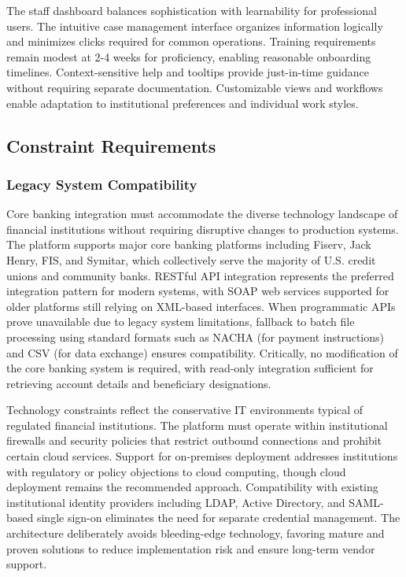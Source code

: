 The staff dashboard balances sophistication with learnability for professional users. The intuitive case management interface organizes information logically and minimizes clicks required for common operations. Training requirements remain modest at 2-4 weeks for proficiency, enabling reasonable onboarding timelines. Context-sensitive help and tooltips provide just-in-time guidance without requiring separate documentation. Customizable views and workflows enable adaptation to institutional preferences and individual work styles.

\subsection{Constraint Requirements}

\subsubsection{Legacy System Compatibility}

Core banking integration must accommodate the diverse technology landscape of financial institutions without requiring disruptive changes to production systems. The platform supports major core banking platforms including Fiserv, Jack Henry, FIS, and Symitar, which collectively serve the majority of U.S. credit unions and community banks. RESTful API integration represents the preferred integration pattern for modern systems, with SOAP web services supported for older platforms still relying on XML-based interfaces. When programmatic APIs prove unavailable due to legacy system limitations, fallback to batch file processing using standard formats such as NACHA (for payment instructions) and CSV (for data exchange) ensures compatibility. Critically, no modification of the core banking system is required, with read-only integration sufficient for retrieving account details and beneficiary designations.

Technology constraints reflect the conservative IT environments typical of regulated financial institutions. The platform must operate within institutional firewalls and security policies that restrict outbound connections and prohibit certain cloud services. Support for on-premises deployment addresses institutions with regulatory or policy objections to cloud computing, though cloud deployment remains the recommended approach. Compatibility with existing institutional identity providers including LDAP, Active Directory, and SAML-based single sign-on eliminates the need for separate credential management. The architecture deliberately avoids bleeding-edge technology, favoring mature and proven solutions to reduce implementation risk and ensure long-term vendor support.

